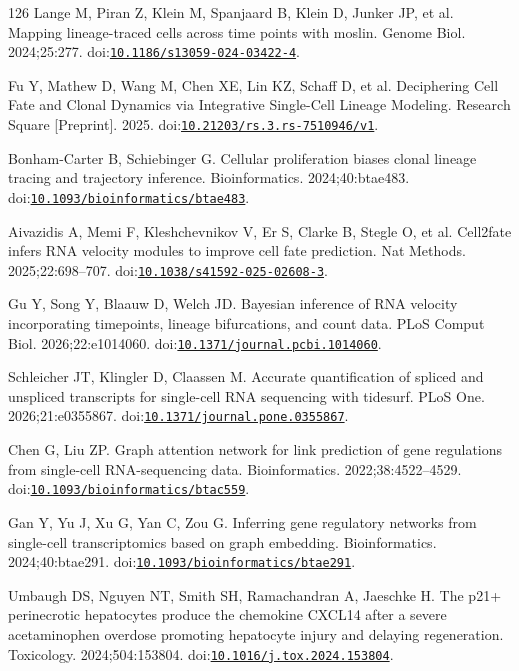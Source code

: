\begin{thebibliography}{126}
Lange M, Piran Z, Klein M, Spanjaard B, Klein D, Junker JP, et al. Mapping lineage-traced cells across time points with moslin. Genome Biol. 2024;25:277. doi:\href{https://doi.org/10.1186/s13059-024-03422-4}{\nolinkurl{10.1186/s13059-024-03422-4}}.

Fu Y, Mathew D, Wang M, Chen XE, Lin KZ, Schaff D, et al. Deciphering Cell Fate and Clonal Dynamics via Integrative Single-Cell Lineage Modeling. Research Square [Preprint]. 2025. doi:\href{https://doi.org/10.21203/rs.3.rs-7510946/v1}{\nolinkurl{10.21203/rs.3.rs-7510946/v1}}.

Bonham-Carter B, Schiebinger G. Cellular proliferation biases clonal lineage tracing and trajectory inference. Bioinformatics. 2024;40:btae483. doi:\href{https://doi.org/10.1093/bioinformatics/btae483}{\nolinkurl{10.1093/bioinformatics/btae483}}.

Aivazidis A, Memi F, Kleshchevnikov V, Er S, Clarke B, Stegle O, et al. Cell2fate infers RNA velocity modules to improve cell fate prediction. Nat Methods. 2025;22:698--707. doi:\href{https://doi.org/10.1038/s41592-025-02608-3}{\nolinkurl{10.1038/s41592-025-02608-3}}.

Gu Y, Song Y, Blaauw D, Welch JD. Bayesian inference of RNA velocity incorporating timepoints, lineage bifurcations, and count data. PLoS Comput Biol. 2026;22:e1014060. doi:\href{https://doi.org/10.1371/journal.pcbi.1014060}{\nolinkurl{10.1371/journal.pcbi.1014060}}.

Schleicher JT, Klingler D, Claassen M. Accurate quantification of spliced and unspliced transcripts for single-cell RNA sequencing with tidesurf. PLoS One. 2026;21:e0355867. doi:\href{https://doi.org/10.1371/journal.pone.0355867}{\nolinkurl{10.1371/journal.pone.0355867}}.

Chen G, Liu ZP. Graph attention network for link prediction of gene regulations from single-cell RNA-sequencing data. Bioinformatics. 2022;38:4522--4529. doi:\href{https://doi.org/10.1093/bioinformatics/btac559}{\nolinkurl{10.1093/bioinformatics/btac559}}.

Gan Y, Yu J, Xu G, Yan C, Zou G. Inferring gene regulatory networks from single-cell transcriptomics based on graph embedding. Bioinformatics. 2024;40:btae291. doi:\href{https://doi.org/10.1093/bioinformatics/btae291}{\nolinkurl{10.1093/bioinformatics/btae291}}.

Umbaugh DS, Nguyen NT, Smith SH, Ramachandran A, Jaeschke H. The p21+ perinecrotic hepatocytes produce the chemokine CXCL14 after a severe acetaminophen overdose promoting hepatocyte injury and delaying regeneration. Toxicology. 2024;504:153804. doi:\href{https://doi.org/10.1016/j.tox.2024.153804}{\nolinkurl{10.1016/j.tox.2024.153804}}.


\end{thebibliography}
